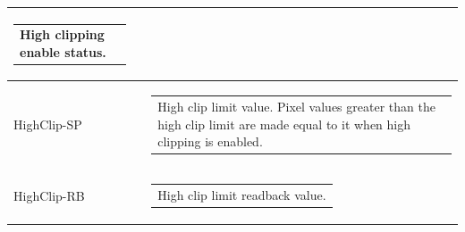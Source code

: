 \documentclass[openany]{article}
\begin{document}
\begin{longtable}{| m{3.0cm} m{4.5cm} m{7.0cm} |}
\begin{tabular}{@{}m{6cm}@{}}
                High clipping enable status.
            \end{tabular} \hypertarget{}{}\\ \hline
        HighClip-SP &  & \begin{tabular}{@{}m{6cm}@{}}
                High clip limit value. Pixel values greater than the high clip
                limit are made equal to it when high clipping is enabled.
            \end{tabular} \\ \hline
        HighClip-RB &  & \begin{tabular}{@{}m{6cm}@{}}
                High clip limit readback value.
            \end{tabular} \hypertarget{}{}\\ \hline
    \end{longtable}
\end{document}
